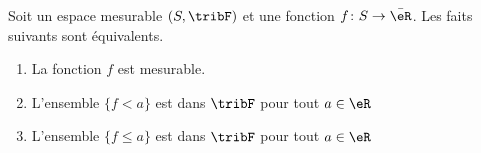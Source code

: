 \begin{theorem}     \label{THOooWHFLooKYGsOm}
    Soit un espace mesurable \( (S,\tribF)\) et une fonction \( f\colon S\to \bar \eR\). Les faits suivants sont équivalents.
    \begin{enumerate}
        \item\label{ITEMooHAMHooYLqUhVi}
            La fonction \( f\) est mesurable.
        \item\label{ITEMooHAMHooYLqUhVii}
            L'ensemble \( \{ f<a \}\) est dans \( \tribF\) pour tout \( a\in \eR\)
        \item\label{ITEMooHAMHooYLqUhViii}
            L'ensemble \( \{ f\leq a \}\) est dans \( \tribF\) pour tout \( a\in \eR\)
    \end{enumerate}
\end{theorem}

